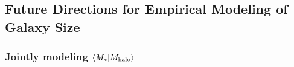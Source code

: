 \documentclass[usenatbib,usegraphicx,letterpaper]{mn2e}
\newcommand{\rhalf}{R_{1/2}}
\newcommand{\mstar}{M_{\ast}}
\newcommand{\mhalo}{M_{\rm halo}}
\newcommand{\rvir}{R_{\rm vir}}
\newcommand{\rspeak}{{R_{\rm s,}}_{\rm M_{peak}}}
\begin{document}

\subsection{Future Directions for Empirical Modeling of Galaxy Size}
\label{subsec:future}

\subsubsection{Jointly modeling $\langle\mstar\vert\mhalo\rangle$}

\end{document}
